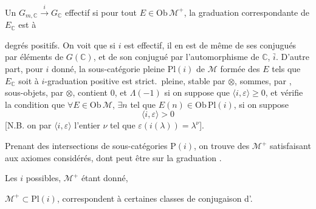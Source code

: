 \documentclass[11pt,a4paper]{article}
\begin{document}

Un \ill{} $G_{m,\mathbb{C}} \xrightarrow{\ i\ } G_{\mathbb{C}}$
  effectif si pour tout
$E \in \mathrm{Ob}\,\mathcal{M}^{+}$, la graduation correspondante de
$E_{\mathbb{C}}$ est à

degrés positifs. On voit que si $i$ est effectif, il en est de même de ses
conjugués par éléments de $G(\mathbb{C})$, et de son conjugué par
l'automorphisme \ill{} de $\mathbb{C}$, \ill{} $\bar{i}$. D'autre part, pour
$i$ donné, la sous-catégorie pleine $\mathrm{Pl}(i)$ de $\mathcal{M}$ formée
des $E$ tels que $E_{\mathbb{C}}$ soit à $i$-graduation positive est
strict.\ pleine, stable par $\otimes$, sommes, par \ill{}, sous-objets, par
$\otimes$, contient $0$, et $\Lambda(-1)$ si on suppose que
$\langle i, \varepsilon \rangle \geq 0$, et vérifie la condition que
$\forall E \in \mathrm{Ob}\,\mathcal{M}$, $\exists n$ tel que
$E(n) \in \mathrm{Ob}\,\mathrm{Pl}(i)$, si on suppose
\[
  \boxed{\langle i, \varepsilon \rangle > 0}
\]
[N.B. on  par $\langle i, \varepsilon \rangle$ l'entier
$\nu$ tel que $\varepsilon(i(\lambda)) = \lambda^{\nu}$].

Prenant des intersections   de sous-catégories
$\mathrm{P}(i)$, on trouve des $\mathcal{M}^{+}$ satisfaisant aux axiomes
considérés, dont peut être \ill{} \ill{} sur la graduation \ill{}.

Les $i$ possibles, $\mathcal{M}^{+}$ étant donné,

\ill{} $\mathcal{M}^{+} \subset \mathrm{Pl}(i)$, 
correspondent à certaines classes de conjugaison d'.
\end{document}
